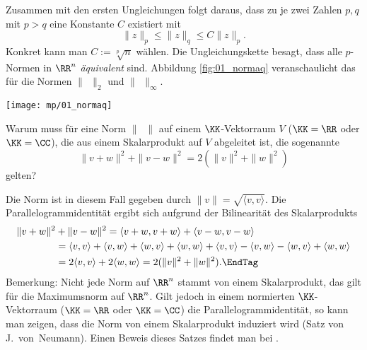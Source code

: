 \begin{antwort}
  \noindent
  Zusammen mit den ersten Ungleichungen folgt daraus, dass zu 
  je zwei Zahlen $p,q$ mit $p>q$ eine Konstante $C$ existiert mit 
  \[
  \| z \|_p \le \| z \|_q  \le C \|z\|_p.
  \]
  Konkret kann man $C:=\sqrt[p]{n}$ wählen. Die 
  Ungleichungskette besagt, dass alle $p$-Normen in $\RR^n$ 
  \textit{äquivalent} sind. Abbildung \ref{fig:01_normaq} veranschaulicht 
  das für die Normen $\|\;\,\|_2$ und $\|\;\,\|_\infty$.
  \AntEnd

  \begin{center}
    \texttt{[image: mp/01\_normaq]}
    \label{fig:01_normaq}
  \end{center}

\end{antwort}






\begin{frage}\label{01_parallelogramm}
  Warum muss für eine Norm 
  $\|\;\; \|$ auf einem $ \KK$-Vektorraum $V$
  ($\KK=\RR$ oder $\KK=\CC$), 
  die aus einem Skalarprodukt auf $V$ abgeleitet ist, 
  die sogenannte 
  \[
  \| v+w \|^2 + \| v-w \|^2 = 2 \left( \|v\|^2 + \|w\|^2 \right)
  \]
  gelten?
\end{frage}

\begin{antwort}
  Die Norm ist in diesem Fall gegeben durch 
  $\| v \|=\sqrt{\langle v,v \rangle }$. Die Parallelogrammidentität 
  ergibt sich aufgrund der Bilinearität des Skalarprodukts
  \begin{align}
    \| v+w \|^2 &+ \| v-w \|^2 = 
    \langle v+w,v+w \rangle + \langle v-w, v-w \rangle \notag \\
    &=
    \langle v,v \rangle + \langle v,w \rangle + \langle w,v \rangle
    +\langle w,w \rangle + \langle v,v \rangle - \langle v,w \rangle
    - \langle w,v \rangle + \langle w,w  \rangle \notag \\
    &= 2 \langle v,v \rangle + 2\langle w,w \rangle
    = 2( \|v \|^2 + \|w\|^2 ). \EndTag
  \end{align}
  \noindent
  Bemerkung: Nicht jede Norm auf $\RR^n$ stammt von einem Skalarprodukt, 
  das gilt \zB für die Maximumsnorm auf $\RR^n$. Gilt jedoch in einem 
  normierten $\KK$-Vektorraum ($\KK=\RR$ oder $\KK=\CC$) die 
  Parallelogrammidentität, so kann man zeigen, dass die Norm von einem 
  Skalarprodukt induziert wird 
  (Satz von J.~von~Neumann). 
  Einen Beweis dieses Satzes findet man bei \citep{Huppert}.
  \AntEnd
\end{antwort}

